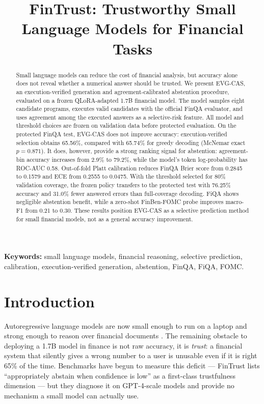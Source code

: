 \documentclass[conference]{IEEEtran}
\title{\textbf{FinTrust: Trustworthy Small Language Models for Financial Tasks}}
\author{\IEEEauthorblockN{Heet Mehta}
\IEEEauthorblockA{TrustFin-SLM Research Project\\
\href{mailto:heetmehta.work@gmail.com}{heetmehta.work@gmail.com}}
\and
\IEEEauthorblockN{Krish Patel}
\IEEEauthorblockA{TrustFin-SLM Research Project\\
\href{mailto:krishpatel19.tech@gmail.com}{krishpatel19.tech@gmail.com}}
\and
\IEEEauthorblockN{Aryan Patel}
\IEEEauthorblockA{TrustFin-SLM Research Project\\
\href{mailto:aryanpatel26.ce@gmail.com}{aryanpatel26.ce@gmail.com}}}
\date{}
\begin{document}
\maketitle

\begin{abstract}
Small language models can reduce the cost of financial analysis, but accuracy alone does
not reveal whether a numerical answer should be trusted. We present EVG-CAS, an
execution-verified generation and agreement-calibrated abstention procedure, evaluated on
a frozen QLoRA-adapted 1.7B financial model. The model samples eight candidate programs,
executes valid candidates with the official FinQA evaluator, and uses agreement among the
executed answers as a selective-risk feature. All model and threshold choices are frozen
on validation data before protected evaluation. On the protected FinQA test, EVG-CAS does
not improve accuracy: execution-verified selection obtains 65.56\%, compared with 65.74\%
for greedy decoding (McNemar exact $p=0.871$). It does, however, provide a strong ranking
signal for abstention: agreement-bin accuracy increases from 2.9\% to 79.2\%, while the
model's token log-probability has ROC-AUC 0.58. Out-of-fold Platt calibration reduces
FinQA Brier score from 0.2845 to 0.1579 and ECE from 0.2555 to 0.0475. With the threshold
selected for 80\% validation coverage, the frozen policy transfers to the protected test
with 76.25\% accuracy and 31.0\% fewer answered errors than full-coverage decoding.
FiQA shows negligible abstention benefit, while a zero-shot FinBen-FOMC probe improves
macro-F1 from 0.21 to 0.30. These results position EVG-CAS as a selective prediction
method for small financial models, not as a general accuracy improvement.
\end{abstract}

\noindent\textbf{Keywords:} small language models, financial reasoning, selective prediction,
calibration, execution-verified generation, abstention, FinQA, FiQA, FOMC.

\section{Introduction}\label{sec:intro}
Autoregressive language models are now small enough to run on a laptop and strong enough to
reason over financial documents \citep{phogat2024finetuning,chen2021finqa}. The remaining
obstacle to deploying a 1.7B model in finance is not raw accuracy, it is \emph{trust}: a
financial system that silently gives a wrong number to a user is unusable even if it is
right 65\% of the time. Benchmarks have begun to measure this deficit --- FinTrust lists
``appropriately abstain when confidence is low'' as a first-class trustfulness dimension
\citep{hu2025fintrust} --- but they diagnose it on GPT-4-scale models and provide no
mechanism a small model can actually use.
\end{document}
